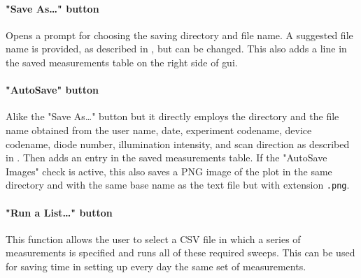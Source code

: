 \paragraph{"Save As\dots" button}
Opens a prompt for choosing the saving directory and file name.
A suggested file name is provided, as described in , but can be changed.
This also adds a line in the saved measurements table on the right side of \gls{gui}.

\paragraph{"AutoSave" button}
Alike the "Save As\dots" button but it directly employs the directory and the file name obtained from the user name, date, experiment codename, device codename, diode number, illumination intensity, and scan direction as described in .
Then adds an entry in the saved measurements table.
If the "AutoSave Images" check is active, this also saves a PNG image of the plot in the same directory and with the same base name as the text file but with extension \texttt{.png}.

\paragraph{"Run a List\dots" button}
This function allows the user to select a CSV file in which a series of measurements is specified and runs all of these required sweeps.
This can be used for saving time in setting up every day the same set of measurements.

